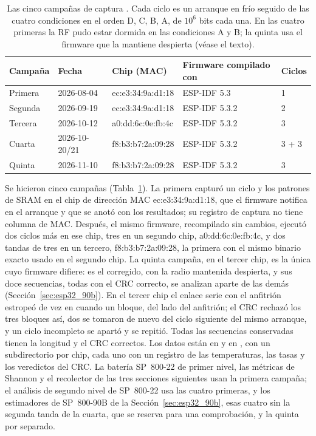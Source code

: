 \begin{table}[htbp]
\centering
\caption{Las cinco campañas de captura \meas{}. Cada ciclo es un arranque en
frío seguido de las cuatro condiciones en el orden D, C, B, A, de $10^6$
bits cada una. En las cuatro primeras la RF pudo estar dormida en las
condiciones A y B; la quinta usa el firmware que la mantiene despierta
(véase el texto).}
\label{tab:esp32_campaigns}
\footnotesize
\begin{tabular}{@{}lllll@{}}
\toprule
Campaña & Fecha & Chip (MAC) & Firmware compilado con & Ciclos \\
\midrule
Primera & 2026-08-04 & ec:e3:34:9a:d1:18 & ESP-IDF 5.3   & 1 \\
Segunda & 2026-09-19 & ec:e3:34:9a:d1:18 & ESP-IDF 5.3.2 & 2 \\
Tercera & 2026-10-12 & a0:dd:6c:0e:fb:4c & ESP-IDF 5.3.2 & 3 \\
Cuarta  & 2026-10-20/21 & f8:b3:b7:2a:09:28 & ESP-IDF 5.3.2 & 3 + 3 \\
Quinta  & 2026-11-10 & f8:b3:b7:2a:09:28 & ESP-IDF 5.3.2 & 3 \\
\bottomrule
\end{tabular}
\end{table}

Se hicieron cinco campañas (Tabla~\ref{tab:esp32_campaigns}). La primera
capturó un ciclo y los patrones de SRAM en el chip de dirección MAC
ec:e3:34:9a:d1:18, que el firmware notifica en el arranque y que se anotó
con los resultados; su registro de captura no tiene columna de MAC.
Después, el mismo firmware, recompilado sin cambios, ejecutó dos ciclos
más en ese chip, tres en un segundo chip, a0:dd:6c:0e:fb:4c, y dos tandas
de tres en un tercero, f8:b3:b7:2a:09:28, la primera con el mismo binario
exacto usado en el segundo chip. La quinta campaña, en el tercer chip,
es la única cuyo firmware difiere: es el corregido, con la radio
mantenida despierta, y sus doce secuencias, todas con el CRC correcto,
se analizan aparte de las demás (Sección~\ref{sec:esp32_90b}). En el tercer chip el enlace serie con el
anfitrión estropeó de vez en cuando un bloque, del lado del anfitrión; el
CRC rechazó los tres bloques así, dos se tomaron de nuevo del ciclo
siguiente del mismo arranque, y un ciclo incompleto se apartó y se
repitió. Todas las secuencias conservadas tienen la longitud y el CRC
correctos. Los datos están en  y en
, con un subdirectorio por chip, cada uno
con un registro de las temperaturas, las tasas y los veredictos del CRC.
La batería SP~800-22 de primer nivel, las métricas de Shannon y el
recolector de las tres secciones siguientes usan la primera campaña; el
análisis de segundo nivel de SP~800-22 usa las cuatro primeras, y los
estimadores de SP~800-90B de la Sección~\ref{sec:esp32_90b}, esas cuatro
sin la segunda tanda de la cuarta, que se reserva para una comprobación,
y la quinta por separado.

